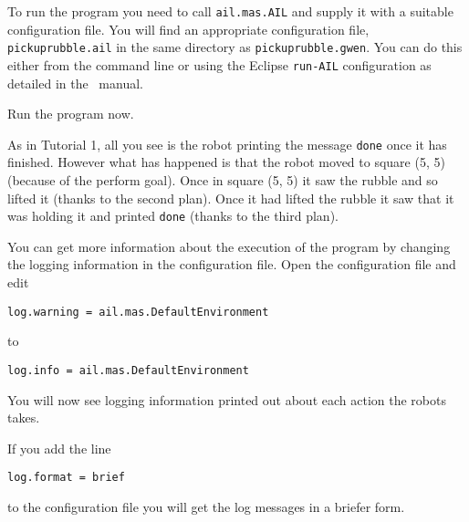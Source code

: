 To run the program you need to call \texttt{ail.mas.AIL} and supply it with a suitable configuration file.  You will find an appropriate configuration file, \texttt{pickuprubble.ail} in the same directory as \texttt{pickuprubble.gwen}.  You can do this either from the command line or using the Eclipse \texttt{run-AIL} configuration as detailed in the \mcapl\ manual.

Run the program now.

As in Tutorial 1, all you see is the robot printing the message \lstinline{done} once it has finished.  However what has happened is that the robot moved to square (5, 5) (because of the perform goal).  Once in square (5, 5) it saw the rubble and so lifted it (thanks to the second plan).  Once it had lifted the rubble it saw that it was holding it and printed \lstinline{done} (thanks to the third plan).

You can get more information about the execution of the program by changing the logging information in the configuration file.  Open the configuration file and edit
\begin{verbatim}
log.warning = ail.mas.DefaultEnvironment
\end{verbatim}
to
\begin{verbatim}
log.info = ail.mas.DefaultEnvironment
\end{verbatim}
You will now see logging information printed out about each action the robots takes.

If you add the line
\begin{verbatim}
log.format = brief
\end{verbatim}
to the configuration file you will get the log messages in a briefer form.

